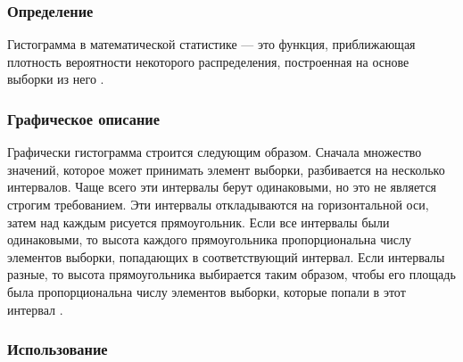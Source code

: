 \documentclass[report.tex]{subfiles}
\begin{document}
\subsubsection{Определение}

Гистограмма в математической статистике --- это функция, приближающая плотность вероятности некоторого распределения, построенная на основе выборки из него \cite{s:hist}.

\subsubsection{Графическое описание}

Графически гистограмма строится следующим образом. Сначала множество значений, которое может принимать элемент выборки, разбивается на несколько интервалов. Чаще всего эти интервалы берут одинаковыми, но это не является строгим требованием. Эти интервалы откладываются на горизонтальной оси, затем над каждым рисуется прямоугольник. Если все интервалы были одинаковыми, то высота каждого прямоугольника пропорциональна числу элементов выборки, попадающих в соответствующий интервал. Если интервалы разные, то высота прямоугольника выбирается таким образом, чтобы его площадь была пропорциональна числу элементов выборки, которые попали в этот интервал \cite{s:hist}.

\subsubsection{Использование}
\end{document}
